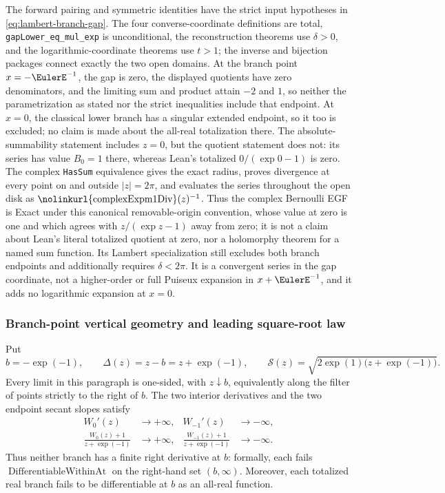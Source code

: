 \documentclass[11pt,oneside]{article}
\theoremstyle{definition}
\theoremstyle{remark}
\newcommand{\lean}[1]{%
  \ifmmode\text{\nolinkurl{#1}}\else\nolinkurl{#1}\fi}
\begin{document}
The forward pairing and symmetric identities have the strict input hypotheses
in \eqref{eq:lambert-branch-gap}.  The four converse-coordinate definitions
are total, \lean{gapLower_eq_mul_exp} is unconditional, the reconstruction
theorems use \(\delta>0\), and the logarithmic-coordinate theorems use
\(t>1\); the inverse and bijection packages connect exactly the two open
domains.  At the branch point \(x=-\EulerE^{-1}\), the
gap is zero, the displayed quotients have zero denominators, and the limiting
sum and product attain \(-2\) and \(1\), so neither the parametrization as
stated nor the strict inequalities include that endpoint.  At \(x=0\), the
classical lower branch has a singular extended endpoint, so it too is
excluded; no claim is made about the all-real totalization there.  The
absolute-summability statement includes \(z=0\), but the quotient statement
does not: its series has value \(B_0=1\) there, whereas Lean's totalized
\(0/(\exp 0-1)\) is zero.  The complex \lean{HasSum} equivalence gives the
exact radius, proves divergence at every point on and outside
\(\lvert z\rvert=2\pi\), and evaluates the series throughout the open disk as
\(\lean{complexExpm1Div}(z)^{-1}\).  Thus the complex Bernoulli EGF is Exact
under this canonical removable-origin convention, whose value at zero is
one and which agrees with \(z/(\exp z-1)\) away from zero; it is not a claim
about Lean's literal totalized quotient at zero, nor a holomorphy theorem for
a named sum function.  Its Lambert specialization still
excludes both branch endpoints and additionally requires \(\delta<2\pi\).
It is a convergent series in the gap coordinate, not a higher-order or full
Puiseux expansion in \(x+\EulerE^{-1}\), and it adds no logarithmic expansion
at \(x=0\).

\subsubsection{Branch-point vertical geometry and leading square-root law}
Put
\begin{equation}
 b=-\exp(-1),\qquad \Delta(z)=z-b=z+\exp(-1),\qquad
 \mathcal S(z)=\sqrt{2\exp(1)\bigl(z+\exp(-1)\bigr)}.
 \label{eq:lambert-branch-point-scale}
\end{equation}
Every limit in this paragraph is one-sided, with \(z\downarrow b\), equivalently along
the filter of points strictly to the right of \(b\).  The two interior derivatives and
the two endpoint secant slopes satisfy
\begin{align}
 W_0'(z)&\longrightarrow+\infty,
 &W_{-1}'(z)&\longrightarrow-\infty,
                                                        \label{eq:lambert-branch-derivative-limits}\\
 \frac{W_0(z)+1}{z+\exp(-1)}&\longrightarrow+\infty,
 &\frac{W_{-1}(z)+1}{z+\exp(-1)}&\longrightarrow-\infty.
                                                        \label{eq:lambert-branch-secant-limits}
\end{align}
Thus neither branch has a finite right derivative at \(b\): formally, each fails
\(\operatorname{DifferentiableWithinAt}\) on the right-hand set \((b,\infty)\).
Moreover, each totalized real branch fails to be differentiable at \(b\) as an
all-real function.
\end{document}
